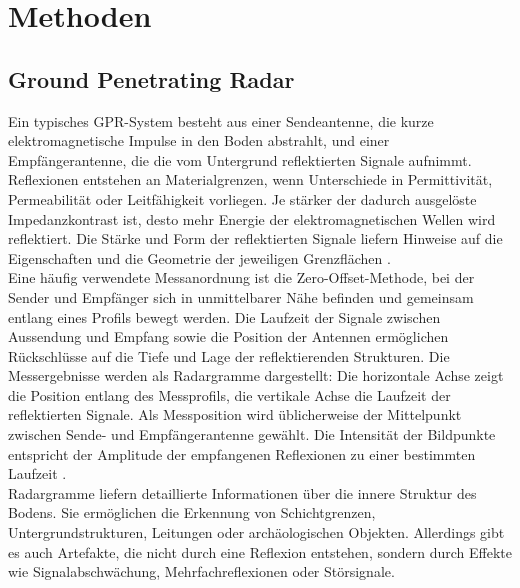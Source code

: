 \section{Methoden}

\subsection{Ground Penetrating Radar}

Ein typisches GPR-System besteht aus einer Sendeantenne, die kurze elektromagnetische Impulse in den Boden abstrahlt, und einer Empfängerantenne, die die vom Untergrund reflektierten Signale aufnimmt. Reflexionen entstehen an Materialgrenzen, wenn Unterschiede in Permittivität, Permeabilität oder Leitfähigkeit vorliegen. Je stärker der dadurch ausgelöste Impedanzkontrast ist, desto mehr Energie der elektromagnetischen Wellen wird reflektiert. Die Stärke und Form der reflektierten Signale liefern Hinweise auf die Eigenschaften und die Geometrie der jeweiligen Grenzflächen \parencite{annan_ground_2003}. \\
Eine häufig verwendete Messanordnung ist die Zero-Offset-Methode, bei der Sender und Empfänger sich in unmittelbarer Nähe befinden und gemeinsam entlang eines Profils bewegt werden. Die Laufzeit der Signale zwischen Aussendung und Empfang sowie die Position der Antennen ermöglichen Rückschlüsse auf die Tiefe und Lage der reflektierenden Strukturen. Die Messergebnisse werden als Radargramme dargestellt: Die horizontale Achse zeigt die Position entlang des Messprofils, die vertikale Achse die Laufzeit der reflektierten Signale. Als Messposition wird üblicherweise der Mittelpunkt zwischen Sende- und Empfängerantenne gewählt. Die Intensität der Bildpunkte entspricht der Amplitude der empfangenen Reflexionen zu einer bestimmten Laufzeit \parencite{annan_ground_2003}. \\
Radargramme liefern detaillierte Informationen über die innere Struktur des Bodens. Sie ermöglichen die Erkennung von Schichtgrenzen, Untergrundstrukturen, Leitungen oder archäologischen Objekten. Allerdings gibt es auch Artefakte, die nicht durch eine Reflexion entstehen, sondern durch Effekte wie Signalabschwächung, Mehrfachreflexionen oder Störsignale.\\
